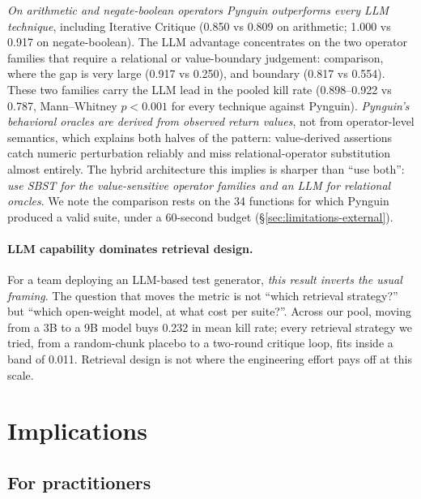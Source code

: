 \documentclass[smallextended]{svjour3}
\begin{document}
\emph{On arithmetic and negate-boolean operators Pynguin
outperforms every LLM technique}, including Iterative Critique (0.850
vs 0.809 on arithmetic; 1.000 vs 0.917 on negate-boolean). The LLM
advantage concentrates on the two operator families that require a
relational or value-boundary judgement: comparison, where the gap is
very large (0.917 vs 0.250), and boundary (0.817 vs 0.554). These
two families carry the LLM lead in the pooled kill rate (0.898--0.922
vs 0.787, Mann--Whitney $p < 0.001$ for every technique against
Pynguin).
\emph{Pynguin's behavioral oracles are derived from observed return
values}, not from operator-level semantics, which explains both
halves of the pattern: value-derived assertions catch numeric
perturbation reliably and miss relational-operator substitution
almost entirely. The hybrid architecture this implies is sharper
than ``use both'': \emph{use SBST for the value-sensitive operator
families and an LLM for relational oracles}. We note the comparison rests on the 34 functions
for which Pynguin produced a valid suite, under a 60-second budget
(\S\ref{sec:limitations-external}).

\paragraph{LLM capability dominates retrieval design.}
\label{sec:discussion-llm-dominates}

For a team deploying an LLM-based test generator, \emph{this result
inverts the usual framing}. The question that moves the metric is not
``which retrieval strategy?'' but ``which open-weight model, at what
cost per suite?''. Across our pool, moving from a 3B to a 9B model
buys 0.232 in mean kill rate; every retrieval strategy we tried, from
a random-chunk placebo to a two-round critique loop, fits inside a
band of 0.011. Retrieval design is not where the engineering effort
pays off at this scale.

\section{Implications}\label{sec:implications}

\subsection{For practitioners}\label{sec:implications-practice}
\end{document}
